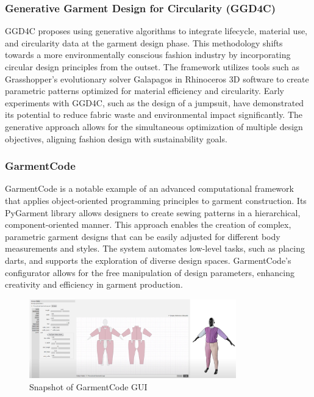 \subsubsection{Generative Garment Design for Circularity (GGD4C)}
GGD4C proposes using generative algorithms to integrate lifecycle, material use, and circularity data at the garment design phase. This methodology shifts towards a more environmentally conscious fashion industry by incorporating circular design principles from the outset. The framework utilizes tools such as Grasshopper’s evolutionary solver Galapagos in Rhinoceros 3D software to create parametric patterns optimized for material efficiency and circularity. Early experiments with GGD4C, such as the design of a jumpsuit, have demonstrated its potential to reduce fabric waste and environmental impact significantly. The generative approach allows for the simultaneous optimization of multiple design objectives, aligning fashion design with sustainability goals.

\subsubsection{GarmentCode}
GarmentCode is a notable example of an advanced computational framework that applies object-oriented programming principles to garment construction. Its PyGarment library allows designers to create sewing patterns in a hierarchical, component-oriented manner. This approach enables the creation of complex, parametric garment designs that can be easily adjusted for different body measurements and styles. The system automates low-level tasks, such as placing darts, and supports the exploration of diverse design spaces. GarmentCode's configurator allows for the free manipulation of design parameters, enhancing creativity and efficiency in garment production.
\begin{figure} [H]
    \centering
    \includegraphics[width=0.8\textwidth]{Images/pygarment.png}
    \caption{Snapshot of GarmentCode GUI}
\end{figure}
